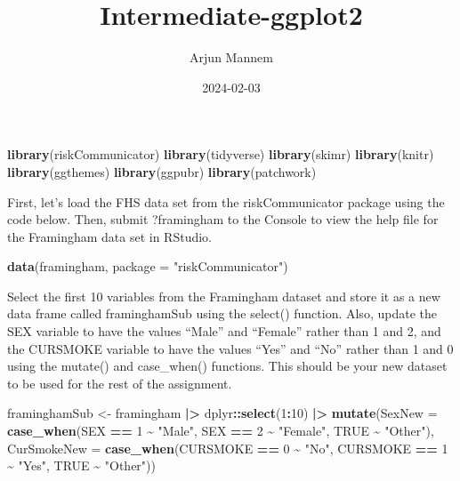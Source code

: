 \documentclass[
]{article}
\title{Intermediate-ggplot2}
\author{Arjun Mannem}
\date{2024-02-03}
\newenvironment{Shaded}{\begin{snugshade}}{\end{snugshade}}
\newcommand{\AttributeTok}[1]{\textcolor[rgb]{0.13,0.29,0.53}{#1}}
\newcommand{\ConstantTok}[1]{\textcolor[rgb]{0.56,0.35,0.01}{#1}}
\newcommand{\DecValTok}[1]{\textcolor[rgb]{0.00,0.00,0.81}{#1}}
\newcommand{\FunctionTok}[1]{\textcolor[rgb]{0.13,0.29,0.53}{\textbf{#1}}}
\newcommand{\NormalTok}[1]{#1}
\newcommand{\OtherTok}[1]{\textcolor[rgb]{0.56,0.35,0.01}{#1}}
\newcommand{\SpecialCharTok}[1]{\textcolor[rgb]{0.81,0.36,0.00}{\textbf{#1}}}
\newcommand{\StringTok}[1]{\textcolor[rgb]{0.31,0.60,0.02}{#1}}
\begin{document}
\maketitle

\begin{Shaded}
\begin{Highlighting}[]
\FunctionTok{library}\NormalTok{(riskCommunicator)}
\FunctionTok{library}\NormalTok{(tidyverse)}
\FunctionTok{library}\NormalTok{(skimr)}
\FunctionTok{library}\NormalTok{(knitr)}
\FunctionTok{library}\NormalTok{(ggthemes)}
\FunctionTok{library}\NormalTok{(ggpubr)}
\FunctionTok{library}\NormalTok{(patchwork)}
\end{Highlighting}
\end{Shaded}

First, let's load the FHS data set from the riskCommunicator package
using the code below. Then, submit ?framingham to the Console to view
the help file for the Framingham data set in RStudio.

\begin{Shaded}
\begin{Highlighting}[]
\FunctionTok{data}\NormalTok{(framingham, }\AttributeTok{package =} \StringTok{"riskCommunicator"}\NormalTok{)}
\end{Highlighting}
\end{Shaded}

Select the first 10 variables from the Framingham dataset and store it
as a new data frame called framinghamSub using the select() function.
Also, update the SEX variable to have the values ``Male'' and ``Female''
rather than 1 and 2, and the CURSMOKE variable to have the values
``Yes'' and ``No'' rather than 1 and 0 using the mutate() and
case\_when() functions. This should be your new dataset to be used for
the rest of the assignment.

\begin{Shaded}
\begin{Highlighting}[]
\NormalTok{framinghamSub }\OtherTok{\textless{}{-}}\NormalTok{ framingham }\SpecialCharTok{|\textgreater{}}
\NormalTok{  dplyr}\SpecialCharTok{::}\FunctionTok{select}\NormalTok{(}\DecValTok{1}\SpecialCharTok{:}\DecValTok{10}\NormalTok{) }\SpecialCharTok{|\textgreater{}}
  \FunctionTok{mutate}\NormalTok{(}\AttributeTok{SexNew =} \FunctionTok{case\_when}\NormalTok{(SEX }\SpecialCharTok{==} \DecValTok{1} \SpecialCharTok{\textasciitilde{}} \StringTok{"Male"}\NormalTok{,}
\NormalTok{                            SEX }\SpecialCharTok{==} \DecValTok{2} \SpecialCharTok{\textasciitilde{}} \StringTok{"Female"}\NormalTok{,}
                            \ConstantTok{TRUE} \SpecialCharTok{\textasciitilde{}} \StringTok{"Other"}\NormalTok{),}
         \AttributeTok{CurSmokeNew =} \FunctionTok{case\_when}\NormalTok{(CURSMOKE }\SpecialCharTok{==} \DecValTok{0} \SpecialCharTok{\textasciitilde{}} \StringTok{"No"}\NormalTok{,}
\NormalTok{                            CURSMOKE }\SpecialCharTok{==} \DecValTok{1} \SpecialCharTok{\textasciitilde{}} \StringTok{"Yes"}\NormalTok{,}
                            \ConstantTok{TRUE} \SpecialCharTok{\textasciitilde{}} \StringTok{"Other"}\NormalTok{))}
\end{Highlighting}
\end{Shaded}
\end{document}
